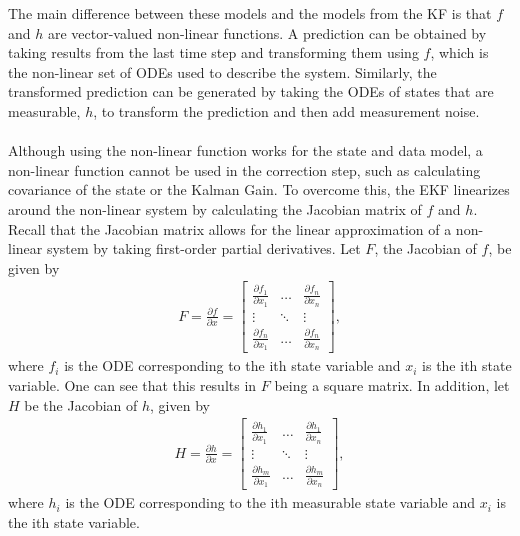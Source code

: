 \noindent The main difference between these models and the models from the KF is that $f$ and $h$ are vector-valued non-linear functions. A prediction can be obtained by taking results from the last time step and transforming them using $f$, which is the non-linear set of ODEs used to describe the system. Similarly, the transformed prediction can be generated by taking the ODEs of states that are measurable, $h$,  to transform the prediction and then add measurement noise. \\ \\
\noindent Although using the non-linear function works for the state and data model, a non-linear function cannot be used in the correction step, such as calculating covariance of the state or the Kalman Gain. To overcome this, the EKF linearizes around the non-linear system by calculating the Jacobian matrix of $f$ and $h$. Recall that the Jacobian matrix allows for the linear approximation of a non-linear system by taking first-order partial derivatives. Let $F$, the Jacobian of $f$, be given by \begin{align*}
      F= \frac{\partial f}{\partial x} =
      \begin{bmatrix}
           \frac{\partial f_1}{\partial x_1} & \hdots & \frac{\partial f_n}{\partial x_n} \\
           \vdots & \ddots & \vdots \\
           \frac{\partial f_n}{\partial x_1}  & \hdots & \frac{\partial f_n}{\partial x_n}
         \end{bmatrix} ,
  \end{align*}
  where $f_i $ is the ODE corresponding to the ith state variable and $x_i$ is the ith state variable. One can see that this results in $F$ being a square matrix. In addition, let $H$ be the Jacobian of $h$, given by
  \begin{align*}
      H = \frac{\partial h}{\partial x} =
     \begin{bmatrix}
           \frac{\partial h_1}{\partial x_1} & \hdots & \frac{\partial h_1}{\partial x_n} \\
           \vdots & \ddots & \vdots \\
           \frac{\partial h_m}{\partial x_1}  & \hdots & \frac{\partial h_{m}}{\partial x_n}
         \end{bmatrix} ,
  \end{align*} 
  where $h_i $ is the ODE corresponding to the ith measurable state variable and $x_i$ is the ith state variable. \\ 
 
